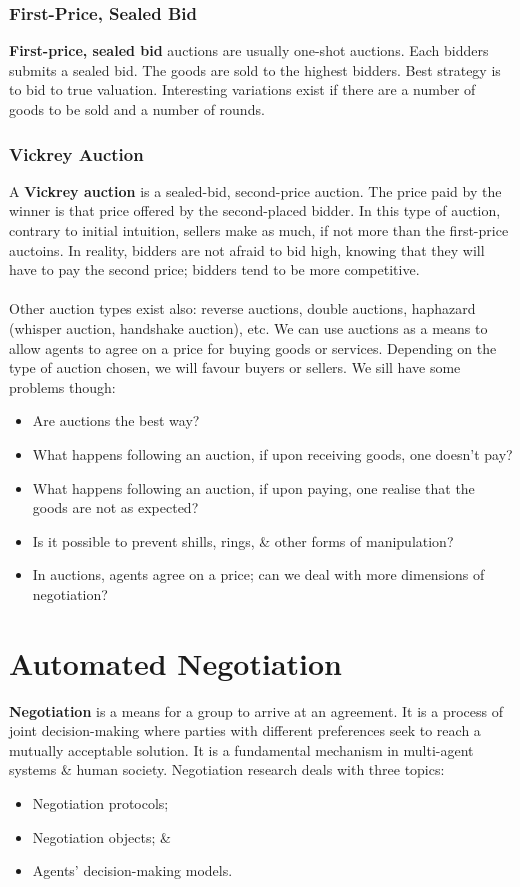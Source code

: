 \documentclass[a4paper,11pt]{article}
\begin{document}
\subsubsection{First-Price, Sealed Bid}
\textbf{First-price, sealed bid} auctions are usually one-shot auctions.
Each bidders submits a sealed bid.
The goods are sold to the highest bidders.
Best strategy is to bid to true valuation.
Interesting variations exist if there are a number of goods to be sold and a number of rounds.

\subsubsection{Vickrey Auction}
A \textbf{Vickrey auction} is a sealed-bid, second-price auction.
The price paid by the winner is that price offered by the second-placed bidder.
In this type of auction, contrary to initial intuition, sellers make as much, if not more than the first-price auctoins.
In reality, bidders are not afraid to bid high, knowing that they will have to pay the second price;
bidders tend to be more competitive.
\\\\
Other auction types exist also: reverse auctions, double auctions, haphazard (whisper auction, handshake auction), etc.
We can use auctions as a means to allow agents to agree on a price for buying goods or services.
Depending on the type of auction chosen, we will favour buyers or sellers.
We sill have some problems though:
\begin{itemize}
    \item   Are auctions the best way?
    \item   What happens following an auction, if upon receiving goods, one doesn't pay?
    \item   What happens following an auction, if upon paying, one realise that the goods are not as expected?
    \item   Is it possible to prevent shills, rings, \& other forms of manipulation?
    \item   In auctions, agents agree on a price; can we deal with more dimensions of negotiation?
\end{itemize}

\section{Automated Negotiation}
\textbf{Negotiation} is a means for a group to arrive at an agreement.
It is a process of joint decision-making where parties with different preferences seek to reach a mutually acceptable solution.
It is a fundamental mechanism in multi-agent systems \& human society.
Negotiation research deals with three topics:
\begin{itemize}
    \item   Negotiation protocols;
    \item   Negotiation objects; \&
    \item   Agents' decision-making models.
\end{itemize}
\end{document}
